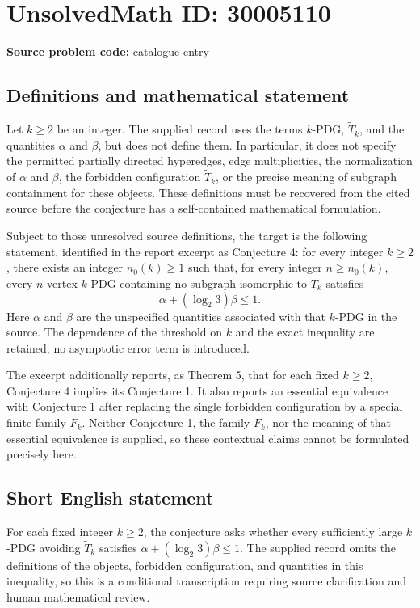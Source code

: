 \documentclass[11pt]{article}
\begin{document}
\section*{UnsolvedMath ID: 30005110}
\textbf{Source problem code:} catalogue entry
\subsection{Definitions and mathematical statement}
Let \(k\geq 2\) be an integer. The supplied record uses the terms \(k\)-PDG, \(\widetilde T_k\), and the quantities \(\alpha\) and \(\beta\), but does not define them. In particular, it does not specify the permitted partially directed hyperedges, edge multiplicities, the normalization of \(\alpha\) and \(\beta\), the forbidden configuration \(\widetilde T_k\), or the precise meaning of subgraph containment for these objects. These definitions must be recovered from the cited source before the conjecture has a self-contained mathematical formulation.

Subject to those unresolved source definitions, the target is the following statement, identified in the report excerpt as Conjecture 4: for every integer \(k\geq 2\), there exists an integer \(n_0(k)\geq 1\) such that, for every integer \(n\geq n_0(k)\), every \(n\)-vertex \(k\)-PDG containing no subgraph isomorphic to \(\widetilde T_k\) satisfies
\[
\alpha+(\log_2 3)\beta\leq 1.
\]
Here \(\alpha\) and \(\beta\) are the unspecified quantities associated with that \(k\)-PDG in the source. The dependence of the threshold on \(k\) and the exact inequality are retained; no asymptotic error term is introduced.

The excerpt additionally reports, as Theorem 5, that for each fixed \(k\geq 2\), Conjecture 4 implies its Conjecture 1. It also reports an essential equivalence with Conjecture 1 after replacing the single forbidden configuration by a special finite family \(F_k\). Neither Conjecture 1, the family \(F_k\), nor the meaning of that essential equivalence is supplied, so these contextual claims cannot be formulated precisely here.
\subsection{Short English statement}
For each fixed integer \(k\geq 2\), the conjecture asks whether every sufficiently large \(k\)-PDG avoiding \(\widetilde T_k\) satisfies \(\alpha+(\log_2 3)\beta\leq 1\). The supplied record omits the definitions of the objects, forbidden configuration, and quantities in this inequality, so this is a conditional transcription requiring source clarification and human mathematical review.
\end{document}
